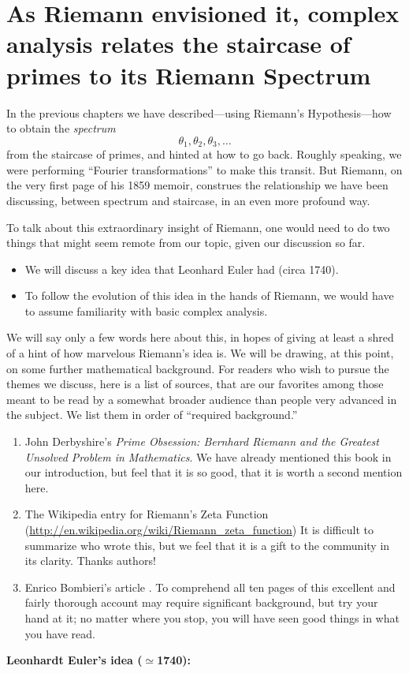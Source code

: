 \documentclass[openany]{book}
\theoremstyle{plain}
\theoremstyle{definition}
\begin{document}
\chapter[As Riemann envisioned it]{As Riemann envisioned it, complex analysis relates the staircase of primes to its Riemann Spectrum\label{ch:envision}}
In the previous chapters we have described---using Riemann's
Hypothesis---how to obtain the {\it
  spectrum} $$\theta_1,\theta_2,\theta_3,\dots$$ from the staircase of
primes, and hinted at how to go back. Roughly speaking, we were
performing ``Fourier transformations'' to make this transit. But
Riemann, on the very first page of his 1859 memoir, construes the
relationship we have been discussing, between spectrum and staircase,
in an even more profound way.

To talk about this extraordinary insight of Riemann, one would need to
do two things that might seem remote from our topic, given our
discussion so far.

\begin{itemize} \item We will discuss a key idea that Leonhard Euler
  had (circa 1740).
 \item To follow the evolution of this idea in the hands of Riemann, we would have to assume familiarity with basic complex analysis.
 \end{itemize}

 We will say only a few words here about this, in hopes of giving at
 least a shred of a hint of how marvelous Riemann's idea is.  We will be drawing, at this point, on some further mathematical background.  For
 readers who wish to pursue the themes we discuss, here is a list of sources,
 that are our favorites among those meant to be read by a somewhat
 broader audience than people very advanced in the subject. We list
 them in order of ``required background.''

 \begin{enumerate}
 \item John Derbyshire's {\it Prime Obsession: Bernhard Riemann and
     the Greatest Unsolved Problem in Mathematics}.  We have already
   mentioned this book in our introduction, but feel that it is so
   good, that it is worth a second mention here.
 \item The Wikipedia entry for Riemann's Zeta Function
   (\url{http://en.wikipedia.org/wiki/Riemann\_zeta\_function}) It is
   difficult to summarize who wrote this, but we feel that it is a
   gift to the community in its clarity. Thanks authors!
 \item Enrico Bombieri's article .
   To comprehend all ten pages of this excellent and fairly thorough
   account may require significant background, but try your hand at
   it; no matter where you stop, you will have seen good things in
   what you have read.
\end{enumerate}
\vskip20pt
{\bf Leonhardt Euler's idea ($\simeq$1740):}
\end{document}
